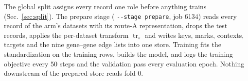The global split assigns every record one role before anything trains
(Sec.~\ref{sec:split}). The prepare stage ( \texttt{-{}-stage prepare}, job 6134)
reads every record of the arm's datasets with its route-A representation, drops the test
records, applies the per-dataset transform $\operatorname{tr}_s$ and writes keys, marks,
contexts, targets and the nine gene--gene edge lists into one store. Training fits the
standardization on the training rows, builds the model, and logs the training objective
every 50 steps and the validation pass every evaluation epoch. Nothing downstream of the
prepared store reads fold 0.
